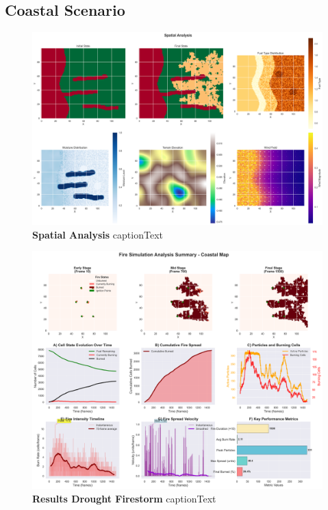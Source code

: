 \subsection{Coastal Scenario}
\begin{figure}[H]
	\centering
	\includegraphics[width=\textwidth]{media/spatial_analysis_coast.png}
	\caption{
		\textbf{Spatial Analysis}
		captionText
	}
	\label{fig:spatial_coast}
\end{figure}

\begin{figure}[H]
	\centering
	\includegraphics[width=\textwidth]{media/report_summary_coast.png}
	\caption{
		\textbf{Results Drought Firestorm}
		captionText
	}
	\label{fig:res_coast}
\end{figure}
